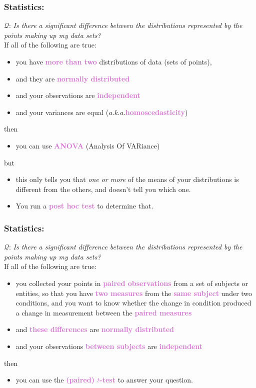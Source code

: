 \documentclass{beamer}
\newcommand{\aka}{\textit{a.k.a.}\xspace}
\newcommand{\key}[1]{\textcolor{orchid}{{\bf #1}}}
\newcommand{\kq}[1]{\textcolor{burntumber}{$\mathcal{Q}$: \emph{#1}}}
\begin{document}
\begin{frame}
\frametitle{Statistics: }
\kq{Is there a significant difference between the distributions represented by the points making up my data sets?}\\
If all of the following are true:
\begin{itemize}
\item you have \key{\bf more than two} distributions of data (sets of points),
\item and they are \key{normally distributed} 
\item and your observations are \key{independent}
\item and your variances are equal (\aka \key{homoscedasticity}) 
\end{itemize}
then \pause
\begin{itemize}
\item you can use \key{ANOVA} (Analysis Of VARiance)
\end{itemize}
but \pause
\begin{itemize}
\item this only tells you that \emph{one or more} of the means of
	your distributions is different from the others, and doesn't tell
	you which one.
\item \pause You run a \key{post hoc test} to determine that.
\end{itemize}
\end{frame}

\begin{frame}
\frametitle{Statistics: }
\kq{Is there a significant difference between the distributions represented by the points making up my data sets?}\\
If all of the following are true:
\begin{itemize}
\item you collected your points in \key{paired observations}
from a set of subjects or entities, so that you have \key{two measures}
from the \key{same subject} under two conditions, and you want to know
whether the change in condition produced a change in measurement
between the \key{paired measures}
\item and \key{these differences} are \key{normally distributed} \pause
\item and your observations \key{between subjects} are \key{independent} \pause
\end{itemize}
then \pause
\begin{itemize}
\item you can use the \key{(paired) $t$-test}
to answer your question.
\end{itemize}
\end{frame}
\end{document}

